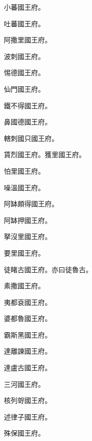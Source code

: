 \begin{pinyinscope}
 小蕃國王府。



 吐蕃國王府。



 阿撒里國王府。



 波刺國王府。



 惕德國王府。



 仙門國王府。



 鐵不得國王府。



 鼻國德國王府。



 轄刺國只國王府。



 賃烈國王府。獲里國王府。



 怕里國王府。



 噪溫國王府。



 阿缽頗得國王府。



 阿缽押國王府。



 拏沒里國王府。



 要里國王府。



 徒睹古國王府。亦曰徒魯古。



 素撒國王府。



 夷都袞國王府。



 婆都魯國王府。



 霸斯黑國王府。



 達離諫國王府。



 達盧古國王府。



 三河國王府。



 核列哿國王府。



 述律子國王府。



 殊保國王府。




\end{pinyinscope}
